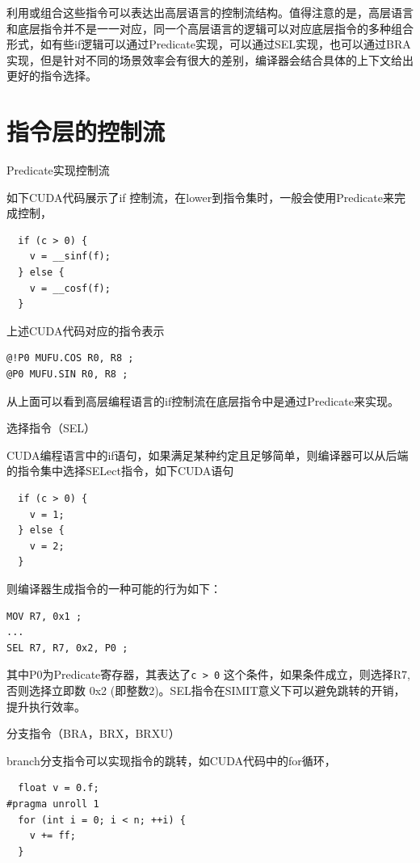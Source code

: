 利用或组合这些指令可以表达出高层语言的控制流结构。值得注意的是，高层语言和底层指令并不是一一对应，同一个高层语言的逻辑可以对应底层指令的多种组合形式，如有些if逻辑可以通过Predicate实现，可以通过SEL实现，也可以通过BRA实现，但是针对不同的场景效率会有很大的差别，编译器会结合具体的上下文给出更好的指令选择。

\section{指令层的控制流}

Predicate实现控制流

如下CUDA代码展示了if 控制流，在lower到指令集时，一般会使用Predicate来完成控制，

\begin{lstlisting}
  if (c > 0) {
    v = __sinf(f);
  } else {
    v = __cosf(f);
  }
\end{lstlisting}

上述CUDA代码对应的指令表示

\begin{lstlisting}
@!P0 MUFU.COS R0, R8 ;
@P0 MUFU.SIN R0, R8 ;
\end{lstlisting}

从上面可以看到高层编程语言的if控制流在底层指令中是通过Predicate来实现。

选择指令（SEL）

CUDA编程语言中的if语句，如果满足某种约定且足够简单，则编译器可以从后端的指令集中选择SELect指令，如下CUDA语句

\begin{lstlisting}
  if (c > 0) {
    v = 1;
  } else {
    v = 2;
  }
\end{lstlisting}

则编译器生成指令的一种可能的行为如下：

\begin{lstlisting}
MOV R7, 0x1 ;
...
SEL R7, R7, 0x2, P0 ;
\end{lstlisting}

其中P0为Predicate寄存器，其表达了\lstinline|c > 0| 这个条件，如果条件成立，则选择R7, 否则选择立即数 0x2 (即整数2)。SEL指令在SIMIT意义下可以避免跳转的开销，提升执行效率。

分支指令（BRA，BRX，BRXU）

branch分支指令可以实现指令的跳转，如CUDA代码中的for循环，

\begin{lstlisting}
  float v = 0.f;
#pragma unroll 1
  for (int i = 0; i < n; ++i) {
    v += ff;
  }
\end{lstlisting}

